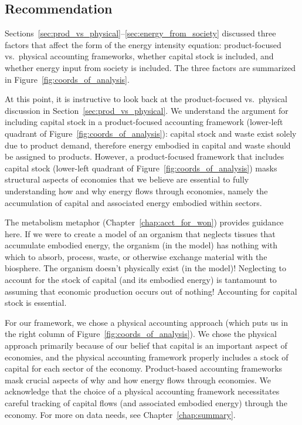 \subsection{Recommendation}
\label{sec:I-O_recommendation}

Sections~\ref{sec:prod_vs_physical}--\ref{sec:energy_from_society} 
discussed three factors that affect the form of the
energy intensity equation: 
product-focused vs.\ physical accounting frameworks,
whether capital stock is included, and
whether energy input from society is included.
The three factors are summarized in Figure~\ref{fig:coords_of_analysis}.

At this point, it is instructive to look back at the 
product-focused vs.\ physical discussion in Section~\ref{sec:prod_vs_physical}.
We understand the argument for including capital stock in a product-focused
accounting framework (lower-left quadrant of Figure~\ref{fig:coords_of_analysis}):
capital stock and waste exist 
solely due to product demand, 
therefore energy embodied in capital and waste should be assigned to products. 
However, a product-focused framework that includes capital stock (lower-left quadrant of
Figure~\ref{fig:coords_of_analysis})
masks structural aspects of economies
that we believe are essential to fully understanding how and why energy flows 
through economies, namely the accumulation of capital
and associated energy embodied within sectors.

The metabolism metaphor (Chapter~\ref{chap:acct_for_won}) provides guidance here. 
If we were to create a model of an organism that neglects 
tissues that accumulate embodied energy,
the organism (in the model) has nothing with which to 
absorb, process, waste, or otherwise exchange
material with the biosphere.
The organism doesn't physically exist (in the model)!
Neglecting to account for the stock of capital (and its embodied energy) 
is tantamount to assuming that economic production occurs out of nothing!
Accounting for capital stock is essential.

For our framework, we chose a physical accounting approach
(which puts us in the right column of Figure~\ref{fig:coords_of_analysis}).
We chose the physical approach primarily because of our belief that 
capital is an important aspect of economies,
and the physical accounting framework
properly includes a stock of capital for each sector of the economy.
Product-based accounting frameworks mask crucial aspects 
of why and how energy flows through economies.
We acknowledge that the choice of a physical accounting framework necessitates
careful tracking of capital flows (and associated embodied energy)
through the economy. 
For more on data needs, see Chapter~\ref{chap:summary}.

